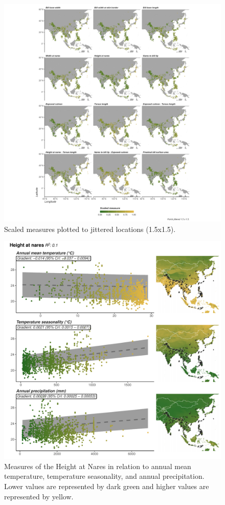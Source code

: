 \documentclass[10pt,a4paper]{article}
\begin{document}
\begin{figure}
\includegraphics[width=0.9\linewidth]{../Figures/measuresMap} \caption{Scaled measures plotted to jittered locations (1.5x1.5).}\label{fig:measuresMap}
\end{figure}

\begin{figure}
\includegraphics[width=0.9\linewidth]{../Figures/climMap_Height.at.nares} \caption{Measures of the Height at Nares in relation to annual mean temperature, temperature seasonality, and annual precipitation. Lower values are represented by dark green and higher values are represented by yellow.}\label{fig:climateComparisonMapHN}
\end{figure}
\end{document}
